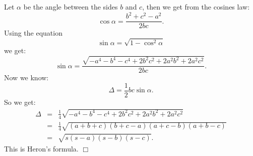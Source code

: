 \documentclass[12pt]{article}
\begin{document}
Let $\alpha$ be the angle between the sides $b$ and $c$, then we get from the cosines law:
$$\cos\alpha =\frac{b^2+c^2-a^2}{2bc}.$$
Using the equation
$$\sin\alpha=\sqrt{1-\cos^2\alpha}$$
we get:
$$\sin\alpha=\frac{\sqrt{-a^4-b^4-c^4+2b^2c^2+2a^2b^2+2a^2c^2}}{2bc}.$$
Now we know:
$$\Delta=\frac{1}{2}bc\sin\alpha.$$
So we get:
\begin{eqnarray*}
\Delta & = & \frac{1}{4}\sqrt{-a^4-b^4-c^4+2b^2c^2+2a^2b^2+2a^2c^2}\\
& = & \frac{1}{4}\sqrt{(a+b+c)(b+c-a)(a+c-b)(a+b-c)}\\
& = & \sqrt{s(s-a)(s-b)(s-c)}.
\end{eqnarray*}
This is Heron's formula. $\Box$
\end{document}
